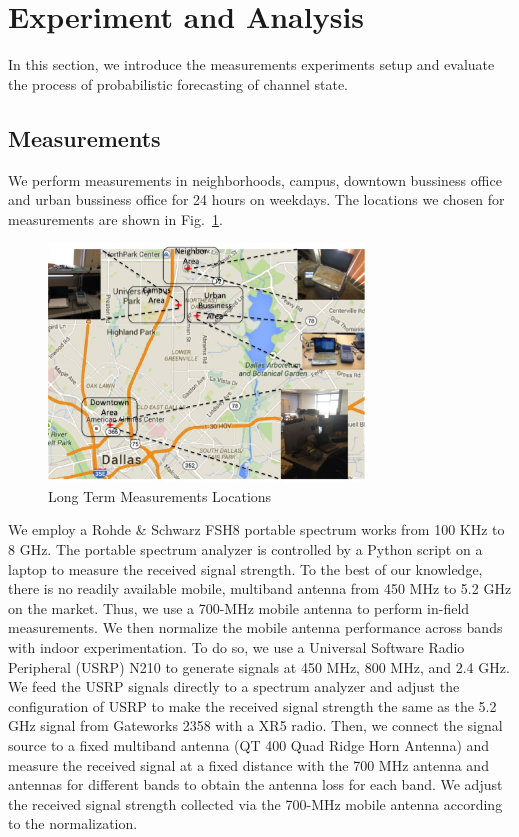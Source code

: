 \section{Experiment and Analysis}
\label{sec:experiment}

In this section, we introduce the measurements experiments setup and 
evaluate the process of probabilistic forecasting of channel state.

\subsection{Measurements}
\label{subsec:measurements}

We perform measurements in neighborhoods, campus, downtown bussiness office and 
urban bussiness office for 24 hours on weekdays. 
The locations we chosen for measurements are shown in Fig.~\ref{fig:measurement_map}.

\begin{figure}
\vspace{-0.0in}
\centering
\includegraphics[width=84mm]{figures/measurements_map}
\vspace{-0.1in}
\caption{Long Term Measurements Locations}
\label{fig:measurement_map}
\vspace{-0.1in}
\end{figure}




We employ a Rohde \& Schwarz FSH8 portable spectrum works from 100 KHz to 8 GHz. 
The portable spectrum analyzer is controlled by a Python script on a laptop to measure 
the received signal strength.
To the best of our knowledge, there is no readily available mobile, multiband antenna from
450 MHz to 5.2 GHz on the market. Thus, we use a 700-MHz mobile antenna to perform in-field
measurements. We then normalize the mobile antenna performance across bands with indoor 
experimentation. To do so, we use a Universal Software Radio Peripheral (USRP) N210 to 
generate signals at 450 MHz, 800 MHz, and 2.4 GHz. We feed the USRP signals directly
to a spectrum analyzer and adjust the configuration of USRP to make the received signal 
strength the same as the 5.2 GHz signal from Gateworks 2358 with a XR5 radio. Then, we connect 
the signal source to a fixed multiband antenna (QT 400 Quad Ridge Horn Antenna) and measure the
received signal at a fixed distance with the 700 MHz antenna and antennas for different bands
to obtain the antenna loss for each band. We adjust the received signal strength
collected via the 700-MHz mobile antenna according to the normalization.

